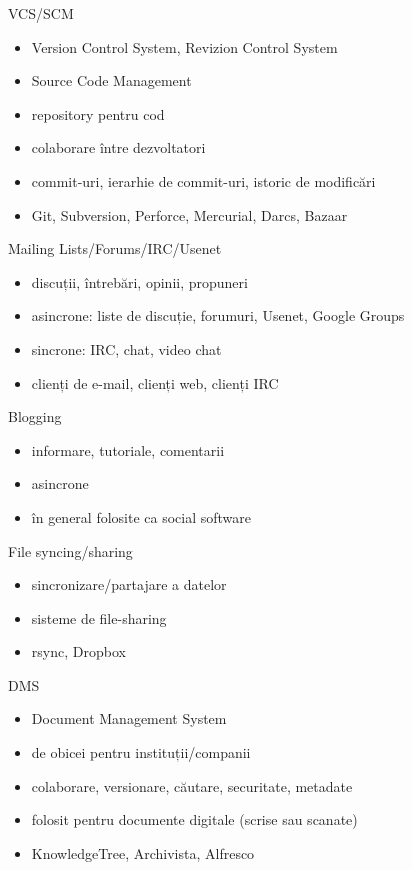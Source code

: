 \documentclass{beamer}
\begin{document}
\begin{frame}{VCS/SCM}
  \begin{itemize}
    \pause
    \item Version Control System, Revizion Control System
    \item Source Code Management
    \item repository pentru cod
    \item colaborare între dezvoltatori
    \item commit-uri, ierarhie de commit-uri, istoric de modificări
    \item Git, Subversion, Perforce, Mercurial, Darcs, Bazaar
  \end{itemize}
\end{frame}

\begin{frame}{Mailing Lists/Forums/IRC/Usenet}
  \begin{itemize}
    \pause
    \item discuții, întrebări, opinii, propuneri
    \item asincrone: liste de discuție, forumuri, Usenet, Google Groups
    \item sincrone: IRC, chat, video chat
    \item clienți de e-mail, clienți web, clienți IRC
  \end{itemize}
\end{frame}

\begin{frame}{Blogging}
  \begin{itemize}
    \pause
    \item informare, tutoriale, comentarii
    \item asincrone
    \item în general folosite ca social software
  \end{itemize}
\end{frame}

\begin{frame}{File syncing/sharing}
  \begin{itemize}
    \pause
    \item sincronizare/partajare a datelor
    \item sisteme de file-sharing
    \item rsync, Dropbox
  \end{itemize}
\end{frame}

\begin{frame}{DMS}
  \begin{itemize}
    \pause
    \item Document Management System
    \item de obicei pentru instituții/companii
    \item colaborare, versionare, căutare, securitate, metadate
    \item folosit pentru documente digitale (scrise sau scanate)
    \item KnowledgeTree, Archivista, Alfresco
  \end{itemize}
\end{frame}
\end{document}
